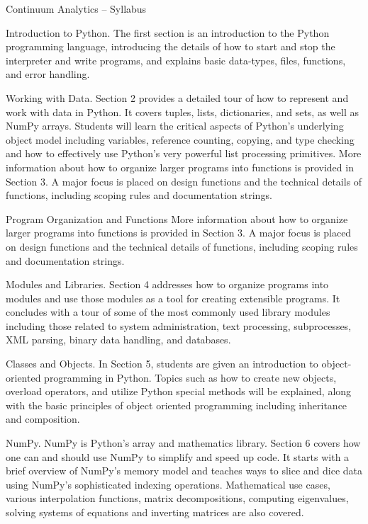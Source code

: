 
Continuum Analytics – Syllabus

Introduction to Python.
The first section  is an introduction to the Python programming language, introducing the details of how to start and stop the interpreter and write programs, and explains basic data-types, files, functions, and error handling.


Working with Data.
Section 2 provides a detailed tour of how to represent and work with data in Python. It covers tuples, lists, dictionaries, and sets, as well as NumPy arrays. Students will learn the critical aspects of Python’s underlying object model including variables, reference counting, copying, and type checking and how to effectively use Python’s very powerful list processing primitives. More information about how to organize larger programs into functions is provided in Section 3. A major focus is placed on design functions and the technical details of functions, including scoping rules and documentation strings.


Program Organization and Functions
More information about how to organize larger programs into functions is provided in Section 3. A major focus is placed on design functions and the technical details of functions, including scoping rules and documentation strings.


Modules and Libraries.
Section 4 addresses how to organize programs into modules and use those modules as a tool for creating extensible programs. It concludes with a tour of some of the most commonly used library modules including those related to system administration, text processing, subprocesses, XML parsing, binary data handling, and databases.


Classes and Objects.
In Section 5, students are given an introduction to object-oriented programming in Python. Topics such as how to create new objects, overload operators, and utilize Python special methods will be explained, along with the basic principles of object oriented programming including inheritance and composition.


NumPy.
NumPy is Python’s array and mathematics library. Section 6 covers how one can and should use NumPy to simplify and speed up code. It starts with a brief overview of NumPy’s memory model and teaches ways to slice and dice data using NumPy’s sophisticated indexing operations. Mathematical use cases, various interpolation functions, matrix decompositions, computing eigenvalues, solving systems of equations and inverting matrices are also covered.


